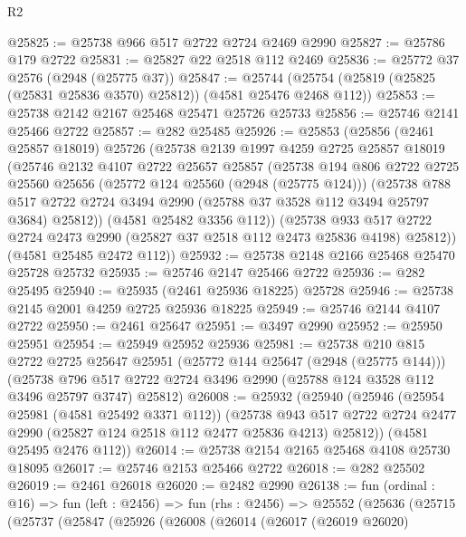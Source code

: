 \begin{lexlean}{R2}
\begin{coremodule}
@25825 := @25738 @966 @517 @2722 @2724 @2469 @2990
@25827 := @25786 @179 @2722
@25831 := @25827 @22 @2518 @112 @2469
@25836 := @25772 @37 @2576 (@2948 (@25775 @37))
@25847 := @25744 (@25754 (@25819 (@25825 (@25831 @25836 @3570) @25812)) (@4581 @25476 @2468 @112))
@25853 := @25738 @2142 @2167 @25468 @25471 @25726 @25733
@25856 := @25746 @2141 @25466 @2722
@25857 := @282 @25485
@25926 := @25853
    (@25856
      (@2461 @25857 @18019)
      @25726
      (@25738
        @2139
        @1997
        @4259
        @2725
        @25857
        @18019
        (@25746
          @2132
          @4107
          @2722
          @25657
          @25857
          (@25738
            @194
            @806
            @2722
            @2725
            @25560
            @25656
            (@25772 @124 @25560 (@2948 (@25775 @124)))
            (@25738
              @788
              @517
              @2722
              @2724
              @3494
              @2990
              (@25788 @37 @3528 @112 @3494 @25797 @3684)
              @25812))
          (@4581 @25482 @3356 @112))
        (@25738
          @933
          @517
          @2722
          @2724
          @2473
          @2990
          (@25827 @37 @2518 @112 @2473 @25836 @4198)
          @25812))
      (@4581 @25485 @2472 @112))
@25932 := @25738 @2148 @2166 @25468 @25470 @25728 @25732
@25935 := @25746 @2147 @25466 @2722
@25936 := @282 @25495
@25940 := @25935 (@2461 @25936 @18225) @25728
@25946 := @25738 @2145 @2001 @4259 @2725 @25936 @18225
@25949 := @25746 @2144 @4107 @2722
@25950 := @2461 @25647
@25951 := @3497 @2990
@25952 := @25950 @25951
@25954 := @25949 @25952 @25936
@25981 := @25738
    @210
    @815
    @2722
    @2725
    @25647
    @25951
    (@25772 @144 @25647 (@2948 (@25775 @144)))
    (@25738 @796 @517 @2722 @2724 @3496 @2990 (@25788 @124 @3528 @112 @3496 @25797 @3747) @25812)
@26008 := @25932
    (@25940
      (@25946
        (@25954 @25981 (@4581 @25492 @3371 @112))
        (@25738
          @943
          @517
          @2722
          @2724
          @2477
          @2990
          (@25827 @124 @2518 @112 @2477 @25836 @4213)
          @25812))
      (@4581 @25495 @2476 @112))
@26014 := @25738 @2154 @2165 @25468 @4108 @25730 @18095
@26017 := @25746 @2153 @25466 @2722
@26018 := @282 @25502
@26019 := @2461 @26018
@26020 := @2482 @2990
@26138 := fun (ordinal : @16) =>
  fun (left : @2456) =>
  fun (rhs : @2456) =>
  @25552
    (@25636
      (@25715
        (@25737
          (@25847
            (@25926
              (@26008
                (@26014
                  (@26017
                    (@26019 @26020)

\end{coremodule}
\end{lexlean}
